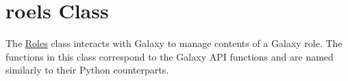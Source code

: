 \hypertarget{group__roles__class}{}\section{roels Class}
\label{group__roles__class}
The \hyperlink{classRoles}{Roles} class interacts with Galaxy to manage contents of a Galaxy role. The functions in this class correspond to the Galaxy A\+PI functions and are named similarly to their Python counterparts. 